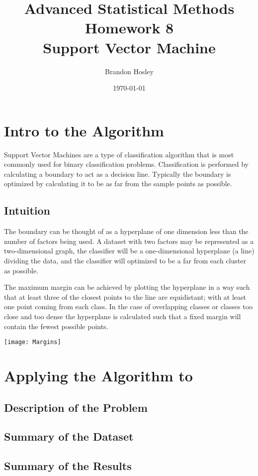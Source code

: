 \documentclass[a4paper,man,natbib]{apa6}
\title{Advanced Statistical Methods Homework 8 \\ Support Vector Machine}
\author{Brandon Hosley}
\date{\today}
\affiliation{University of Illinois - Springfield}
\begin{document}
\maketitle
\singlespacing

\section{Intro to the Algorithm}

Support Vector Machines are a type of classification algorithm that is most commonly used for binary classification problems. Classification is performed by calculating a boundary to act as a decision line. Typically the boundary is optimized by calculating it to be as far from the sample points as possible.

\subsection{Intuition}

The boundary can be thought of as a hyperplane of one dimension less than the number of factors being used. A dataset with two factors may be represented as a two-dimensional graph, the classifier will be a one-dimensional hyperplane (a line) dividing the data, and the classifier will optimized to be a far from each cluster as possible.

The maximum margin can be achieved by plotting the hyperplane in a way such that at least three of the closest points to the line are equidistant; with at least one point coming from each class. In the case of overlapping classes or classes too close and too dense the hyperplane is calculated such that a fixed margin will contain the fewest possible points.

\begin{center}
	\texttt{[image: Margins]}
\end{center}


\section{Applying the Algorithm to }
\subsection{Description of the Problem}
\subsection{Summary of the Dataset}
\subsection{Summary of the Results}
\end{document}
